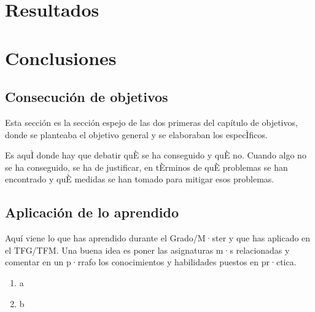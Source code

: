 \documentclass[a4paper, 12pt]{book}
\begin{document}

\cleardoublepage
\chapter{Resultados}



\cleardoublepage
\chapter{Conclusiones}
\label{chap:conclusiones}


\section{Consecución de objetivos}
\label{sec:consecucion-objetivos}

Esta sección es la sección espejo de las dos primeras del capítulo de objetivos,
donde se planteaba el objetivo general y se elaboraban los especÌficos.

Es aquÌ donde hay que debatir quÈ se ha conseguido y quÈ no. Cuando algo no
se ha conseguido, se ha de justificar, en tÈrminos de quÈ problemas se han
encontrado y quÈ medidas se han tomado para mitigar esos problemas.


\section{Aplicación de lo aprendido}
\label{sec:aplicacion}

Aquí viene lo que has aprendido durante el Grado/M·ster y que has aplicado
en el TFG/TFM. Una buena idea es poner las asignaturas m·s relacionadas y
comentar en un p·rrafo los conocimientos y habilidades puestos en pr·ctica.

\begin{enumerate}
  \item a
  \item b
\end{enumerate}
\end{document}
